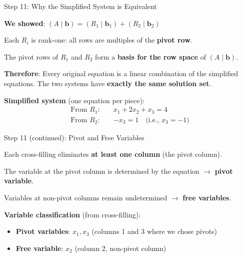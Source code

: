 \documentclass[10pt]{beamer}
\theoremstyle{definition}
\newcommand{\x}[1]{\alert{\textbf{#1}}}
\begin{document}
\begin{frame}{Step 11: Why the Simplified System is Equivalent}

\x{We showed}: $(A \mid \mathbf{b}) = (R_1 \mid \mathbf{b}_1) + (R_2 \mid \mathbf{b}_2)$

\vspace{0.5em}

Each $R_i$ is rank-one: all rows are multiples of the \textbf{pivot row}.

The pivot rows of $R_1$ and $R_2$ form a \x{basis for the row space} of $(A \mid \mathbf{b})$.

\vspace{0.5em}

\x{Therefore}: Every original equation is a linear combination of the simplified equations. The two systems have \textbf{exactly the same solution set}.

\vspace{1em}

\x{Simplified system} (one equation per piece):
\begin{align*}
\text{From } R_1: \quad &x_1 + 2x_2 + x_3 = 4 \\
\text{From } R_2: \quad &-x_3 = 1 \quad \text{(i.e., } x_3 = -1\text{)}
\end{align*}

\end{frame}

\begin{frame}{Step 11 (continued): Pivot and Free Variables}

Each cross-filling eliminates \x{at least one column} (the pivot column).

The variable at the pivot column is determined by the equation $\to$ \x{pivot variable}.

Variables at non-pivot columns remain undetermined $\to$ \x{free variables}.

\vspace{1em}

\x{Variable classification} (from cross-filling):
\begin{itemize}
\item \x{Pivot variables}: $x_1, x_3$ (columns 1 and 3 where we chose pivots)
\item \x{Free variable}: $x_2$ (column 2, non-pivot column)
\end{itemize}

\end{frame}
\end{document}
